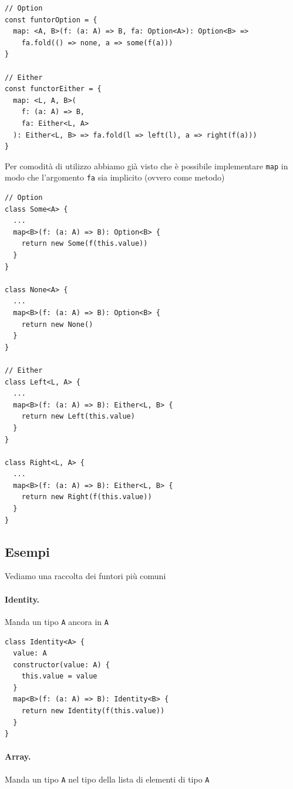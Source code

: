 \documentclass[12pt]{article}
\begin{document}
\begin{verbatim}
// Option
const funtorOption = {
  map: <A, B>(f: (a: A) => B, fa: Option<A>): Option<B> =>
    fa.fold(() => none, a => some(f(a)))
}

// Either
const functorEither = {
  map: <L, A, B>(
    f: (a: A) => B,
    fa: Either<L, A>
  ): Either<L, B> => fa.fold(l => left(l), a => right(f(a)))
}
\end{verbatim}

Per comodità di utilizzo abbiamo già visto che è possibile implementare \texttt{map} in modo che
l'argomento \texttt{fa} sia implicito (ovvero come metodo)

\begin{verbatim}
// Option
class Some<A> {
  ...
  map<B>(f: (a: A) => B): Option<B> {
    return new Some(f(this.value))
  }
}

class None<A> {
  ...
  map<B>(f: (a: A) => B): Option<B> {
    return new None()
  }
}

// Either
class Left<L, A> {
  ...
  map<B>(f: (a: A) => B): Either<L, B> {
    return new Left(this.value)
  }
}

class Right<L, A> {
  ...
  map<B>(f: (a: A) => B): Either<L, B> {
    return new Right(f(this.value))
  }
}
\end{verbatim}

\subsection{Esempi}

Vediamo una raccolta dei funtori più comuni

\paragraph{Identity.}

Manda un tipo \texttt{A} ancora in \texttt{A}

\begin{verbatim}
class Identity<A> {
  value: A
  constructor(value: A) {
    this.value = value
  }
  map<B>(f: (a: A) => B): Identity<B> {
    return new Identity(f(this.value))
  }
}
\end{verbatim}

\paragraph{Array.}

Manda un tipo \texttt{A} nel tipo della lista di elementi di tipo \texttt{A}
\end{document}

